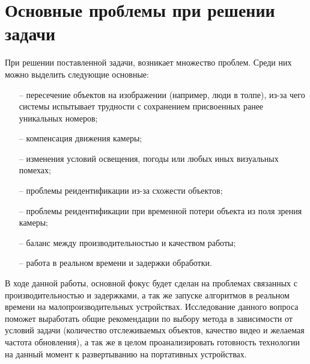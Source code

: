 \section{Основные проблемы при решении задачи}
При решении поставленной задачи, возникает множество проблем. Среди них можно выделить следующие основные:
\begin{itemize}
    \item[--] пересечение объектов на изображении (например, люди в толпе), из-за чего системы испытывает трудности с сохранением присвоенных ранее уникальных номеров;
    \item[--] компенсация движения камеры;
    \item[--] изменения условий освещения, погоды или любых иных визуальных помехах;
    \item[--] проблемы реидентификации из-за схожести объектов;
    \item[--] проблемы реидентификации при временной потери объекта из поля зрения камеры;
    \item[--] баланс между производительностью и качеством работы;
    \item[--] работа в реальном времени и задержки обработки.
\end{itemize}

В ходе данной работы, основной фокус будет сделан на проблемах связанных с производительностью и задержками, а так же запуске алгоритмов в реальном времени на малопроизводительных устройствах. 
Исследование данного вопроса поможет выработать общие рекомендации по выбору метода в зависимости от условий задачи (количество отслеживаемых объектов, качество видео и желаемая частота обновления), а так же в целом проанализировать готовность технологии на данный момент к развертыванию на портативных устройствах.

